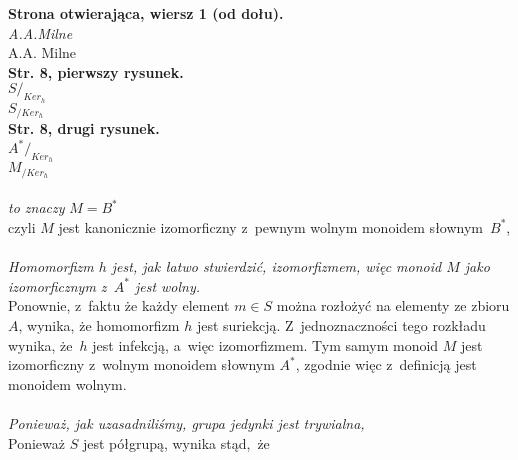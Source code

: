 \documentclass[a4paper,11pt]{article}
\begin{document}
\vspace{\spaceTwo}


\noindent
\textbf{Strona otwierająca, wiersz 1 (od dołu).} \\
\Jest  \textit{A.A.Milne} \\
\Powin A.A. Milne \\
\textbf{Str. 8, pierwszy rysunek.} \\
\Jest  $S /_{ Ker_{ h } }$ \\
\Powin $S_{ / Ker_{ h } }$ \\
\textbf{Str. 8, drugi rysunek.} \\
\Jest  $A^{ * } /_{ Ker_{ h } }$ \\
\Powin $M_{ / Ker_{ h } }$ \\
 \\
\Jest  \textit{to znaczy} $M = B^{ * }$ \\
\Powin czyli $M$ jest kanonicznie izomorficzny z~pewnym wolnym monoidem
słownym~$B^{ * }$, \\
 \\
\Jest  \textit{Homomorfizm $h$ jest, jak łatwo stwierdzić, izomorfizmem,
  więc monoid $M$ jako izomorficznym z~$A^{ * }$ jest wolny.} \\
\Powin Ponownie, z~faktu że każdy element $m \in S$ można rozłożyć na
  elementy ze zbioru $A$, wynika, że homomorfizm $h$ jest suriekcją.
  Z~jednoznaczności tego rozkładu wynika, że~$h$ jest infekcją, a~więc
  izomorfizmem. Tym samym monoid $M$ jest izomorficzny z~wolnym monoidem
  słownym $A^{ * }$, zgodnie więc z~definicją jest monoidem wolnym. \\
 \\
\Jest  \textit{Ponieważ, jak uzasadniliśmy, grupa jedynki jest
  trywialna,} \\
\Powin Ponieważ $S$ jest półgrupą, wynika stąd,~że \\





















{}






\end{document}
